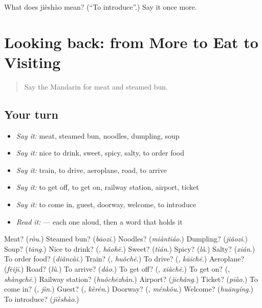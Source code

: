 \begin{tcolorbox}[breakable,colback=teal!4,colframe=teal!35!black,title={Before you move on}]
What does jièshào mean? (\textquotedblleft{}To introduce\textquotedblright{}.) Say it once more.
\end{tcolorbox}
\section[(dialogue)]{Looking back: from More to Eat to Visiting}

\label{lesson:ZH-R74-review-70-74}



\begin{quote}
Say the Mandarin for meat and steamed bun.
\end{quote}

\subsection*{Your turn}
\begin{itemize}
\raggedright
  \item \emph{Say it:} meat, steamed bun, noodles, dumpling, soup
  \item \emph{Say it:} nice to drink, sweet, spicy, salty, to order food
  \item \emph{Say it:} train, to drive, aeroplane, road, to arrive
  \item \emph{Say it:} to get off, to get on, railway station, airport, ticket
  \item \emph{Say it:} to come in, guest, doorway, welcome, to introduce
  \item \emph{Read it:}      — each one aloud, then a word that holds it
\end{itemize}

\begin{tcolorbox}[breakable,colback=teal!4,colframe=teal!35!black,title={Before you move on}]
Meat? (\emph{ròu}.) Steamed bun? (\emph{bāozi}.) Noodles? (\emph{miàntiáo}.) Dumpling? (\emph{jiǎozi}.) Soup? (\emph{tāng}.) Nice to drink? (\textbf{}, \emph{hǎohē}.) Sweet? (\emph{tián}.) Spicy? (\emph{là}.) Salty? (\emph{xián}.) To order food? (\emph{diǎncài}.) Train? (\textbf{}, \emph{huǒchē}.) To drive? (\textbf{}, \emph{kāichē}.) Aeroplane? (\emph{fēijī}.) Road? (\emph{lù}.) To arrive? (\emph{dào}.) To get off? (\textbf{}, \emph{xiàchē}.) To get on? (\textbf{}, \emph{shàngchē}.) Railway station? (\emph{huǒchēzhàn}.) Airport? (\emph{jīchǎng}.) Ticket? (\emph{piào}.) To come in? (\textbf{}, \emph{jìn}.) Guest? (\textbf{}, \emph{kèrén}.) Doorway? (\textbf{}, \emph{ménkǒu}.) Welcome? (\emph{huānyíng}.) To introduce? (\emph{jièshào}.)
\end{tcolorbox}
